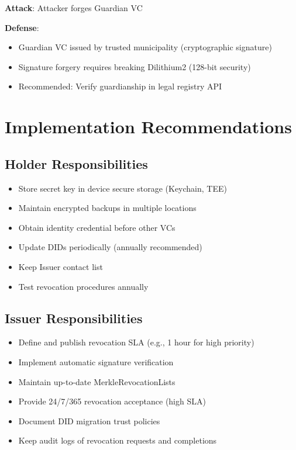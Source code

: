 \textbf{Attack}: Attacker forges Guardian VC

\textbf{Defense}:
\begin{itemize}
  \item Guardian VC issued by trusted municipality (cryptographic signature)
  \item Signature forgery requires breaking Dilithium2 (128-bit security)
  \item Recommended: Verify guardianship in legal registry API
\end{itemize}

\section{Implementation Recommendations}

\subsection{Holder Responsibilities}

\begin{itemize}
  \item Store secret key in device secure storage (Keychain, TEE)
  \item Maintain encrypted backups in multiple locations
  \item Obtain identity credential before other VCs
  \item Update DIDs periodically (annually recommended)
  \item Keep Issuer contact list
  \item Test revocation procedures annually
\end{itemize}

\subsection{Issuer Responsibilities}

\begin{itemize}
  \item Define and publish revocation SLA (e.g., 1 hour for high priority)
  \item Implement automatic signature verification
  \item Maintain up-to-date MerkleRevocationLists
  \item Provide 24/7/365 revocation acceptance (high SLA)
  \item Document DID migration trust policies
  \item Keep audit logs of revocation requests and completions
\end{itemize}

